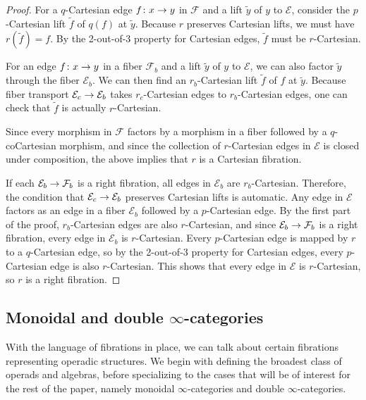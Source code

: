 \documentclass[10pt]{amsart}
\numberwithin{equation}{section}
\theoremstyle{definition}
\newcommand{\cE}{\mathcal{E}}
\newcommand{\cF}{\mathcal{F}}
\renewcommand{\to}{\mathchoice{\longrightarrow}{\rightarrow}{}{}}
\begin{document}
	\begin{proof}
		For a $q$-Cartesian edge $f\colon x\to y$ in $\cF$ and a lift $\tilde{y}$ of $y$ to $\cE$, consider the $p$-Cartesian lift $\tilde{f}$ of $q(f)$ at $\tilde{y}$.
    Because $r$ preserves Cartesian lifts, we must have $r(\tilde{f}) = f$.
    By the 2-out-of-3 property for Cartesian edges, $\tilde{f}$ must be $r$-Cartesian.

		For an edge $f\colon x\to y$ in a fiber $\cF_{b}$ and a lift $\tilde{y}$ of $y$ to $\cE$, we can also factor $\tilde{y}$ through the fiber $\cE_{b}$. We can then find an $r_{b}$-Cartesian lift $\tilde{f}$ of $f$ at $\tilde{y}$. Because fiber transport $\cE_{c} \to \cE_{b}$ takes $r_{c}$-Cartesian edges to $r_{b}$-Cartesian edges, one can check that $\tilde{f}$ is actually $r$-Cartesian.

		Since every morphism in $\cF$ factors by a morphism in a fiber followed by a $q$-coCartesian morphism, and since the collection of $r$-Cartesian edges in $\cE$ is closed under composition, the above implies that $r$ is a Cartesian fibration.

		If each $\cE_{b}\to \cF_{b}$ is a right fibration, all edges in $\cE_{b}$ are $r_{b}$-Cartesian.
    Therefore, the condition that $\cE_{c}\to \cE_{b}$ preserves Cartesian lifts is automatic.
    Any edge in $\cE$ factors as an edge in a fiber $\cE_{b}$ followed by a $p$-Cartesian edge.
    By the first part of the proof, $r_{b}$-Cartesian edges are also $r$-Cartesian, and since $\cE_{b}\to \cF_{b}$ is a right fibration, every edge in $\cE_{b}$ is $r$-Cartesian.
    Every $p$-Cartesian edge is mapped by $r$ to a $q$-Cartesian edge, so by the 2-out-of-3 property for Cartesian edges, every $p$-Cartesian edge is also $r$-Cartesian.
    This shows that every edge in $\cE$ is $r$-Cartesian, so $r$ is a right fibration.
	\end{proof}


	\subsection{Monoidal and double $\infty$-categories}\label{subsec:monoidal_categories}

	With the language of fibrations in place, we can talk about certain fibrations representing operadic structures.
  We begin with defining the broadest class of operads and algebras, before specializing to the cases that will be of interest for the rest of the paper, namely monoidal $\infty$-categories and double $\infty$-categories.
\end{document}
